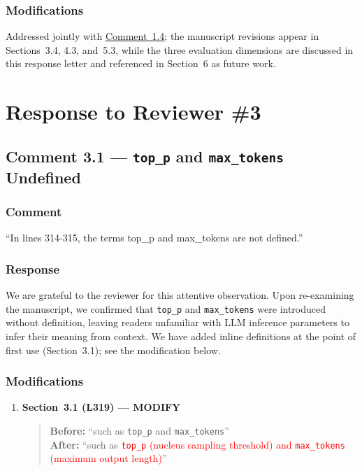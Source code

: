 \documentclass[11pt,a4paper]{article}
\begin{document}
\subsubsection{Modifications}
Addressed jointly with \hyperref[subsec:comment1.4]{Comment~1.4}; the manuscript revisions appear in Sections~3.4, 4.3, and~5.3, while the three evaluation dimensions are discussed in this response letter and referenced in Section~6 as future work.

\newpage
\section{Response to Reviewer \#3}

\subsection{Comment 3.1 --- \texttt{top\_p} and \texttt{max\_tokens} Undefined}

\subsubsection{Comment}
``In lines 314-315, the terms top\_p and max\_tokens are not defined.''

\subsubsection{Response}
We are grateful to the reviewer for this attentive observation. Upon re-examining the manuscript, we confirmed that \texttt{top\_p} and \texttt{max\_tokens} were introduced without definition, leaving readers unfamiliar with LLM inference parameters to infer their meaning from context. We have added inline definitions at the point of first use (Section~3.1); see the modification below.

\subsubsection{Modifications}
\begin{enumerate}
\item \textbf{Section~3.1 (L319) --- MODIFY}
\begin{quote}
\textbf{Before:} ``such as \texttt{top\_p} and \texttt{max\_tokens}''\\[4pt]
\textbf{After:} ``such as \textcolor{red}{\texttt{top\_p} (nucleus sampling threshold) and \texttt{max\_tokens} (maximum output length)}''
\end{quote}
\end{enumerate}
\end{document}
